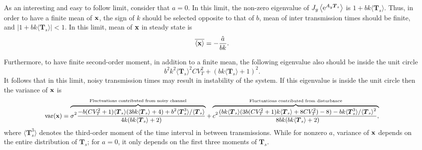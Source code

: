 \documentclass[letterpaper, 10 pt,one column, conference]{ieeeconf}  %
\begin{document}
As an interesting and easy to follow limit, consider that $a=0$. In this limit, the non-zero eigenvalue of $J_y \left\langle  {\rm e}^{ A_y \boldsymbol T_s} \right \rangle$ is $1+bk \langle \boldsymbol T_s \rangle $. Thus, in order to have a finite mean of $\bold x$, the sign of $k$ should be selected opposite to that of $b$, mean of inter transmission times should be finite, and $\vert 1+bk \langle \boldsymbol T_s \rangle \vert <1$. In this limit, mean of $\bold x$  in steady state is 
\begin{equation}
\overline{\langle {\bold{x}} \rangle} = -\frac{\hat{a}}{bk}.
\end{equation}

Furthermore, to have finite second-order moment, in addition to a finite mean, the following eigenvalue also should be inside the unit circle
\begin{equation}
b^2 k^2  \langle \boldsymbol T_s \rangle ^2 CV^2_T+(b k \langle \boldsymbol T_s \rangle +1)^2. 
\end{equation}
It follows that in this limit, noisy transmission times may result in instability of the system. If this eigenvalue is inside the unit circle then the variance of $\bold x$ is \begin{equation} \small\begin{aligned}
\text{var}(\bold x )=\overbrace{\sigma^2 \frac{-b (CV^2_T+1)  \langle \boldsymbol T_s \rangle (3 b k \langle \boldsymbol T_s \rangle  +4)+ b^2  \langle \boldsymbol T_s^3 \rangle /\langle \boldsymbol T_s \rangle }{4 k (b k\langle \boldsymbol T_s \rangle +2)}}^\text{Fluctuations contributed from noisy channel} +\overbrace{c^2 \frac{(b k  \langle \boldsymbol T_s \rangle (3 b (CV^2_T +1) k  \langle \boldsymbol T_s \rangle +8CV^2_T)-8)- bk \langle \boldsymbol T_s^3 \rangle /\langle \boldsymbol T_s \rangle^2 }{8 b k (b k  \langle \boldsymbol T_s \rangle+2)} ,}^\text{Fluctuations contributed from disturbance}
\end{aligned}
\end{equation}
where $\langle \boldsymbol T_s^3 \rangle$ denotes the third-order moment of the time interval in between transmissions. 
While for nonzero $a$, variance of $\bold x$ depends on the entire distribution of $\boldsymbol T_s$; for $a=0$, it only depends on the first three moments of $\boldsymbol T_s$.
\end{document}
